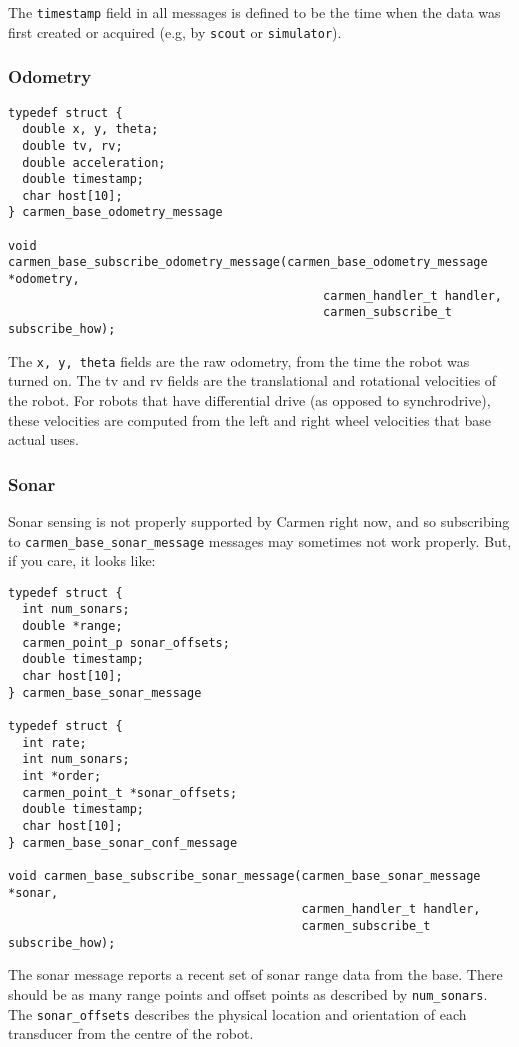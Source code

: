 \documentclass{article}
\begin{document}
The \verb!timestamp! field in all messages is defined to be the time when the
data was first created or acquired (e.g, by \verb!scout! or \verb!simulator!).

\subsubsection{Odometry}

\begin{verbatim}
typedef struct {
  double x, y, theta;
  double tv, rv;
  double acceleration;
  double timestamp;
  char host[10];
} carmen_base_odometry_message

void carmen_base_subscribe_odometry_message(carmen_base_odometry_message *odometry,
                                            carmen_handler_t handler,
                                            carmen_subscribe_t subscribe_how);
\end{verbatim}

The \verb!x, y, theta! fields are the raw odometry, from the time the robot
was turned on. The tv and rv fields are the translational and rotational
velocities of the robot. For robots that have differential drive (as opposed
to synchrodrive), these velocities are computed from the left and right wheel
velocities that base actual uses. 

\subsubsection{Sonar}

Sonar sensing is not properly supported by Carmen right now, and so
subscribing to \verb!carmen_base_sonar_message! messages may sometimes not
work properly. But, if you care, it looks like:

\begin{verbatim}
typedef struct {
  int num_sonars;
  double *range;
  carmen_point_p sonar_offsets;
  double timestamp;
  char host[10];
} carmen_base_sonar_message

typedef struct {
  int rate;
  int num_sonars;
  int *order;
  carmen_point_t *sonar_offsets;
  double timestamp;
  char host[10];
} carmen_base_sonar_conf_message

void carmen_base_subscribe_sonar_message(carmen_base_sonar_message *sonar,
                                         carmen_handler_t handler,
                                         carmen_subscribe_t subscribe_how);
\end{verbatim}

The sonar message reports a recent set of sonar range data from the
base. There should be as many range points and offset points as described by
\verb!num_sonars!. The \verb!sonar_offsets! describes the physical location
and orientation of each transducer from the centre of the robot. 
\end{document}
